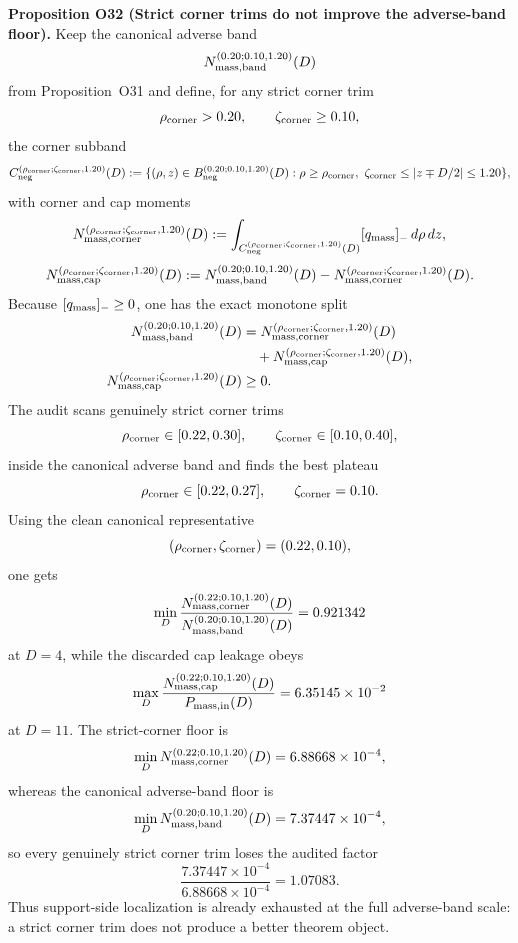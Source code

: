 \documentclass[aps,prd,onecolumn,notitlepage,nofootinbib,superscriptaddress,11pt,floatfix]{revtex4-2}
\begin{document}
\medskip\noindent\textbf{Proposition O32 (Strict corner trims do not improve the adverse-band floor).}
Keep the canonical adverse band
\[
N_{\rm mass,band}^{(0.20;0.10,1.20)}(D)
\]
from Proposition~O31 and define, for any strict corner trim
\[
\rho_{\rm corner}>0.20,
\qquad
\zeta_{\rm corner}\ge 0.10,
\]
the corner subband
\[
C_{\rm neg}^{(\rho_{\rm corner};\zeta_{\rm corner},1.20)}(D)
:=
\{(\rho,z)\in B_{\rm neg}^{(0.20;0.10,1.20)}(D): \rho\ge \rho_{\rm corner},\ \zeta_{\rm corner}\le |z\mp D/2|\le 1.20\},
\]
with corner and cap moments
\[
N_{\rm mass,corner}^{(\rho_{\rm corner};\zeta_{\rm corner},1.20)}(D)
:=
\int_{C_{\rm neg}^{(\rho_{\rm corner};\zeta_{\rm corner},1.20)}(D)} [q_{\rm mass}]_-\,d\rho\,dz,
\]
\[
N_{\rm mass,cap}^{(\rho_{\rm corner};\zeta_{\rm corner},1.20)}(D)
:=
N_{\rm mass,band}^{(0.20;0.10,1.20)}(D)
-
N_{\rm mass,corner}^{(\rho_{\rm corner};\zeta_{\rm corner},1.20)}(D).
\]
Because \([q_{\rm mass}]_-\ge 0\), one has the exact monotone split
\[
\begin{aligned}
N_{\rm mass,band}^{(0.20;0.10,1.20)}(D)
&=
N_{\rm mass,corner}^{(\rho_{\rm corner};\zeta_{\rm corner},1.20)}(D)\\
&\quad+
N_{\rm mass,cap}^{(\rho_{\rm corner};\zeta_{\rm corner},1.20)}(D),\\
N_{\rm mass,cap}^{(\rho_{\rm corner};\zeta_{\rm corner},1.20)}(D)&\ge 0.
\end{aligned}
\]
The audit
scans genuinely strict corner trims
\[
\rho_{\rm corner}\in[0.22,0.30],
\qquad
\zeta_{\rm corner}\in[0.10,0.40],
\]
inside the canonical adverse band and finds the best plateau
\[
\rho_{\rm corner}\in[0.22,0.27],
\qquad
\zeta_{\rm corner}=0.10.
\]
Using the clean canonical representative
\[
(\rho_{\rm corner},\zeta_{\rm corner})=(0.22,0.10),
\]
one gets
\[
\min_D
\frac{N_{\rm mass,corner}^{(0.22;0.10,1.20)}(D)}
{N_{\rm mass,band}^{(0.20;0.10,1.20)}(D)}
=
0.921342
\]
at \(D=4\), while the discarded cap leakage obeys
\[
\max_D
\frac{N_{\rm mass,cap}^{(0.22;0.10,1.20)}(D)}
{P_{\rm mass,in}(D)}
=
6.35145\times10^{-2}
\]
at \(D=11\). The strict-corner floor is
\[
\min_D N_{\rm mass,corner}^{(0.22;0.10,1.20)}(D)
=
6.88668\times10^{-4},
\]
whereas the canonical adverse-band floor is
\[
\min_D N_{\rm mass,band}^{(0.20;0.10,1.20)}(D)
=
7.37447\times10^{-4},
\]
so every genuinely strict corner trim loses the audited factor
\[
\frac{7.37447\times10^{-4}}{6.88668\times10^{-4}}
=
1.07083.
\]
Thus support-side localization is already exhausted at the full adverse-band scale: a strict corner trim does not produce a better theorem object.
\end{document}

